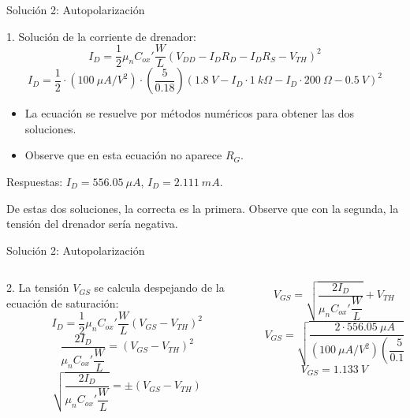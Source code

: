 \documentclass[t,aspectratio=169]{beamer}
\begin{document}
\begin{frame}{Solución 2: Autopolarización}

1. Solución de la corriente de drenador:
\[ I_D = \dfrac{1}{2} \mu_n C_{ox}' \dfrac{W}{L} \left(V_{DD} - I_D R_D - I_D R_S - V_{TH}\right)^2 \]
\[ I_D = \dfrac{1}{2} \cdot (100\ \mu A/V^2) \cdot \left(\dfrac{5}{0.18}\right) \left(1.8\ V - I_D \cdot 1\ k\Omega - I_D \cdot 200\ \Omega - 0.5\ V\right)^2 \]

\begin{itemize}
    \item La ecuación se resuelve por métodos numéricos para obtener las dos soluciones.
    \item Observe que en esta ecuación no aparece $R_G$.
\end{itemize}

\vspace{5mm}
Respuestas: $I_D = 556.05\ \mu A$, $I_D = 2.111\ mA$.

\vspace{5mm}
De estas dos soluciones, la correcta es la primera. Observe que con la segunda, la tensión del drenador sería negativa.

\end{frame}


\begin{frame}{Solución 2: Autopolarización}

\begin{columns}

\begin{column}{0.5\textwidth}

2. La tensión $V_{GS}$ se calcula despejando de la ecuación de saturación:
\[ I_D = \dfrac{1}{2} \mu_n C_{ox}' \dfrac{W}{L} \left( V_{GS} - V_{TH} \right)^2 \]
\[ \dfrac{2 I_D}{\mu_n C_{ox}' \dfrac{W}{L}} = \left( V_{GS} - V_{TH} \right)^2 \]
\[ \sqrt{\dfrac{2 I_D}{\mu_n C_{ox}' \dfrac{W}{L}}} = \pm ( V_{GS} - V_{TH} ) \]

\end{column}

\begin{column}{0.5\textwidth}

\[ V_{GS} = \sqrt{\dfrac{2 I_D}{\mu_n C_{ox}' \dfrac{W}{L}}} + V_{TH} \]
\[ V_{GS} = \sqrt{\dfrac{2 \cdot 556.05\ \mu A}{(100\ \mu A/V^2) \left( \dfrac{5}{0.18} \right) }} + 0.5\ V \]
\[ V_{GS} = 1.133\ V \]

\end{column}

\end{columns}

\end{frame}
\end{document}
